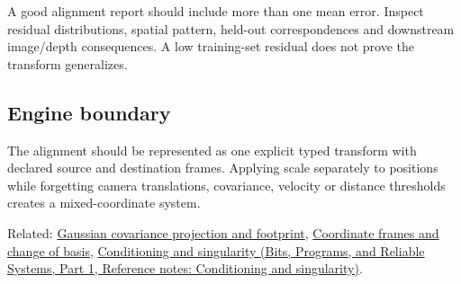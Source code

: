 A good alignment report should include more than one mean error. Inspect residual distributions, spatial pattern, held-out correspondences and downstream image/depth consequences. A low training-set residual does not prove the transform generalizes.

\subsection{Engine boundary}\label{appendix-5f40b4fea463-engine-boundary}

\hypertarget{appendix-5f40b4fea463-engine-boundary}{}

The alignment should be represented as one explicit typed transform with declared source and destination frames. Applying scale separately to positions while forgetting camera translations, covariance, velocity or distance thresholds creates a mixed-coordinate system.

Related: \hyperref[appendix-24269cb6977c]{Gaussian covariance projection and footprint}, \hyperref[appendix-1bae9457dbc3]{Coordinate frames and change of basis}, \href{../01-Bits-Programs-and-Reliable-Systems-P01/main.pdf\#appendix-8f6a01f284a7}{Conditioning and singularity (Bits, Programs, and Reliable Systems, Part 1, Reference notes: Conditioning and singularity)}.
